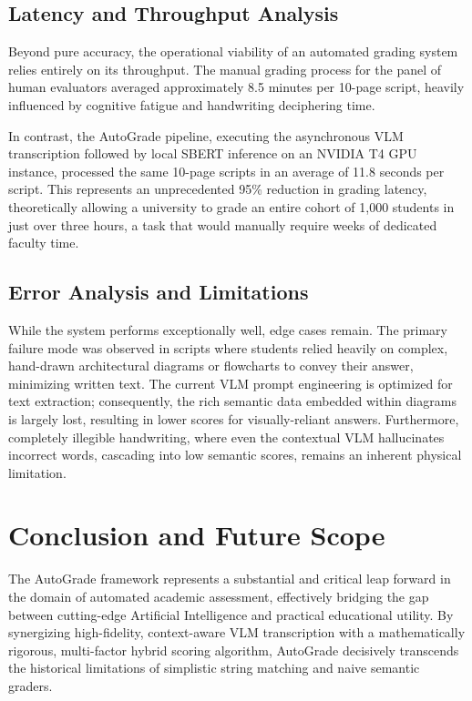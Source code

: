 \documentclass[conference]{IEEEtran}
\begin{document}
\subsection{Latency and Throughput Analysis}
Beyond pure accuracy, the operational viability of an automated grading system relies entirely on its throughput. The manual grading process for the panel of human evaluators averaged approximately 8.5 minutes per 10-page script, heavily influenced by cognitive fatigue and handwriting deciphering time.

In contrast, the AutoGrade pipeline, executing the asynchronous VLM transcription followed by local SBERT inference on an NVIDIA T4 GPU instance, processed the same 10-page scripts in an average of 11.8 seconds per script. This represents an unprecedented 95\% reduction in grading latency, theoretically allowing a university to grade an entire cohort of 1,000 students in just over three hours, a task that would manually require weeks of dedicated faculty time. 

\subsection{Error Analysis and Limitations}
While the system performs exceptionally well, edge cases remain. The primary failure mode was observed in scripts where students relied heavily on complex, hand-drawn architectural diagrams or flowcharts to convey their answer, minimizing written text. The current VLM prompt engineering is optimized for text extraction; consequently, the rich semantic data embedded within diagrams is largely lost, resulting in lower scores for visually-reliant answers. Furthermore, completely illegible handwriting, where even the contextual VLM hallucinates incorrect words, cascading into low semantic scores, remains an inherent physical limitation.

\section{Conclusion and Future Scope}
The AutoGrade framework represents a substantial and critical leap forward in the domain of automated academic assessment, effectively bridging the gap between cutting-edge Artificial Intelligence and practical educational utility. By synergizing high-fidelity, context-aware VLM transcription with a mathematically rigorous, multi-factor hybrid scoring algorithm, AutoGrade decisively transcends the historical limitations of simplistic string matching and naive semantic graders. 
\end{document}
